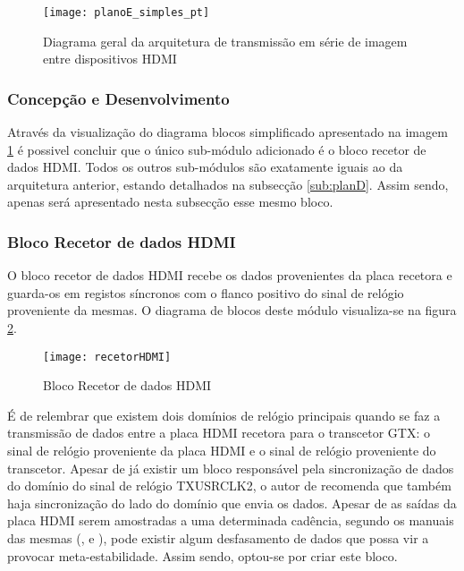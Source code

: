 \begin{figure}[h!]
	\begin{center}
		\leavevmode
		\texttt{[image: planoE\_simples\_pt]}
		\captionsetup{width=1.0\linewidth}
		\caption[Diagrama geral da arquitetura de transmissão em série de imagem entre dispositivos HDMI]{Diagrama geral da arquitetura de transmissão em série de imagem entre dispositivos HDMI}
		\label{fig:planE_simples}
	\end{center}
\end{figure}


\subsubsection{Concepção e Desenvolvimento}

Através da visualização do diagrama blocos simplificado apresentado na imagem \ref{fig:planE_simples} é possivel concluir que o único sub-módulo adicionado é o bloco recetor de dados HDMI. Todos os outros sub-módulos são exatamente iguais ao da arquitetura anterior, estando detalhados na subsecção \ref{sub:planD}. Assim sendo, apenas será apresentado nesta subsecção esse mesmo bloco.

\subsubsection*{Bloco Recetor de dados HDMI}
O bloco recetor de dados HDMI recebe os dados provenientes da placa recetora e guarda-os em registos síncronos com o flanco positivo do sinal de relógio proveniente da mesmas. O diagrama de blocos deste módulo visualiza-se na figura \ref{fig:recetorHDMI}.
\begin{figure}[h!]
	\begin{center}
		\leavevmode
		\texttt{[image: recetorHDMI]}
		\captionsetup{width=1.0\linewidth}
		\caption[Bloco recetor de dados HDMI]{Bloco Recetor de dados HDMI}
		\label{fig:recetorHDMI}
	\end{center}
\end{figure}

É de relembrar que existem dois domínios de relógio principais quando se faz a transmissão de dados entre a placa HDMI recetora para o transcetor GTX: o sinal de relógio proveniente da placa HDMI e o sinal de relógio proveniente do transcetor. Apesar de já existir um bloco responsável pela sincronização de dados do domínio do sinal de relógio TXUSRCLK2, o autor de \cite{R024} recomenda que também haja sincronização do lado do domínio que envia os dados. Apesar de as saídas da placa HDMI serem amostradas a uma determinada cadência, segundo os manuais das mesmas (\cite{R009}, \cite{R014} e \cite{R013}), pode existir algum desfasamento de dados que possa vir a provocar meta-estabilidade. Assim sendo, optou-se por criar este bloco.

